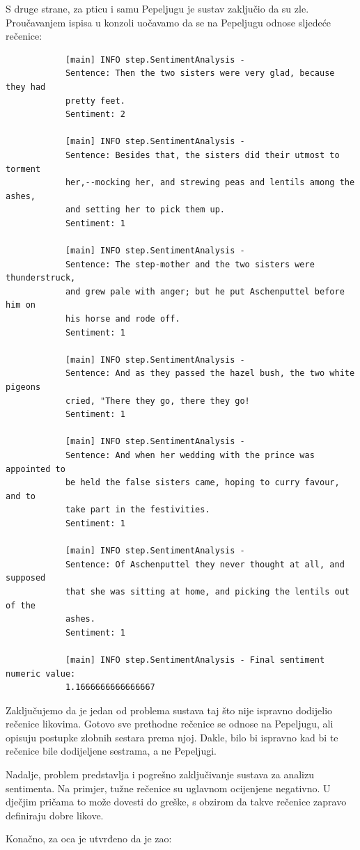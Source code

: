 \documentclass[a4paper,twoside,12pt]{memoir} %
\begin{document}
		S druge strane, za pticu i samu Pepeljugu je sustav zaključio da su zle. Pro\-u\-ča\-va\-njem ispisa u konzoli uočavamo da se na Pepeljugu odnose sljedeće rečenice:

		\begin{verbatim}
			[main] INFO step.SentimentAnalysis -
			Sentence: Then the two sisters were very glad, because they had
			pretty feet.
			Sentiment: 2

			[main] INFO step.SentimentAnalysis -
			Sentence: Besides that, the sisters did their utmost to torment
			her,--mocking her, and strewing peas and lentils among the ashes,
			and setting her to pick them up.
			Sentiment: 1

			[main] INFO step.SentimentAnalysis -
			Sentence: The step-mother and the two sisters were thunderstruck,
			and grew pale with anger; but he put Aschenputtel before him on
			his horse and rode off.
			Sentiment: 1

			[main] INFO step.SentimentAnalysis -
			Sentence: And as they passed the hazel bush, the two white pigeons
			cried, "There they go, there they go!
			Sentiment: 1

			[main] INFO step.SentimentAnalysis -
			Sentence: And when her wedding with the prince was appointed to
			be held the false sisters came, hoping to curry favour, and to
			take part in the festivities.
			Sentiment: 1

			[main] INFO step.SentimentAnalysis -
			Sentence: Of Aschenputtel they never thought at all, and supposed
			that she was sitting at home, and picking the lentils out of the
			ashes.
			Sentiment: 1

			[main] INFO step.SentimentAnalysis - Final sentiment numeric value:
			1.1666666666666667
		\end{verbatim}

		Zaključujemo da je jedan od problema sustava taj što nije ispravno dodijelio rečenice likovima. Gotovo sve prethodne rečenice se odnose na Pepeljugu, ali opisuju postupke zlobnih sestara prema njoj. Dakle, bilo bi ispravno kad bi te rečenice bile dodijeljene sestrama, a ne Pepeljugi.

		Nadalje, problem predstavlja i pogrešno zaključivanje sustava za analizu sentimenta. Na primjer, tužne rečenice su uglavnom ocijenjene negativno. U dječjim pričama to može dovesti do greške, s obzirom da takve rečenice zapravo definiraju dobre likove.

		Konačno, za oca je utvrđeno da je zao:
\end{document}
